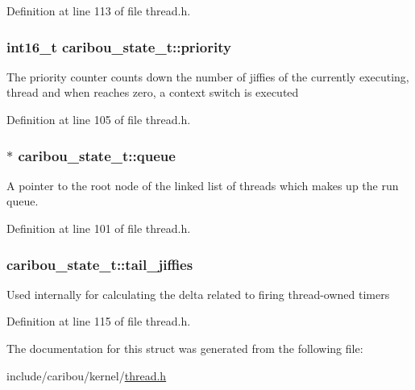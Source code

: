 Definition at line 113 of file thread.\-h.

\hypertarget{structcaribou__state__t_a946baa831ec2072be75decdc41338a6c}{
\subsubsection[{priority}]{\setlength{\rightskip}{0pt plus 5cm}int16\-\_\-t caribou\-\_\-state\-\_\-t\-::priority}}\label{structcaribou__state__t_a946baa831ec2072be75decdc41338a6c}
The priority counter counts down the number of jiffies of the currently executing, thread and when reaches zero, a context switch is executed 

Definition at line 105 of file thread.\-h.

\hypertarget{structcaribou__state__t_a56f11edf4f1af20e0dbada89e7682ef7}{
\subsubsection[{queue}]{$\ast$ caribou\-\_\-state\-\_\-t\-::queue}}\label{structcaribou__state__t_a56f11edf4f1af20e0dbada89e7682ef7}
A pointer to the root node of the linked list of threads which makes up the run queue. 

Definition at line 101 of file thread.\-h.

\hypertarget{structcaribou__state__t_a7bf6d1d467345264fe4f3bebe00acb25}{
\subsubsection[{tail\-\_\-jiffies}]{ caribou\-\_\-state\-\_\-t\-::tail\-\_\-jiffies}}\label{structcaribou__state__t_a7bf6d1d467345264fe4f3bebe00acb25}
Used internally for calculating the delta related to firing thread-\/owned timers 

Definition at line 115 of file thread.\-h.



The documentation for this struct was generated from the following file\-:\begin{DoxyCompactItemize}
\item 
include/caribou/kernel/\hyperlink{thread_8h}{thread.\-h}\end{DoxyCompactItemize}
